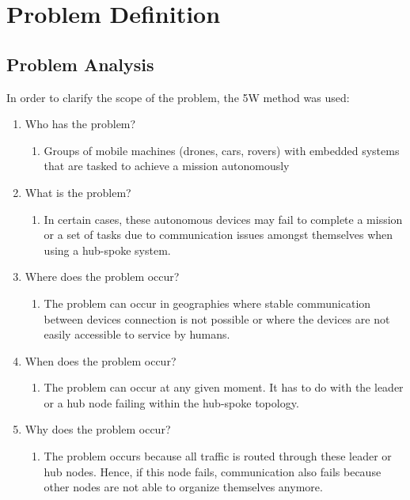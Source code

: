 \section{Problem Definition}
\subsection{Problem Analysis}
In order to clarify the scope of the problem, the 5W method was used:

\begin{enumerate}

    \item Who has the problem?
    \begin{enumerate}
        \item Groups of mobile machines (drones, cars, rovers) with embedded systems that are tasked to achieve a mission autonomously
    \end{enumerate}
    
    \item What is the problem?
    \begin{enumerate}
        \item In certain cases, these autonomous devices may fail to complete a mission or a set of tasks due to communication issues amongst themselves when using a hub-spoke system.
    \end{enumerate}
    
    \item Where does the problem occur?
    \begin{enumerate}
        \item The problem can occur in geographies where stable communication between devices connection is not possible or where the devices are not easily accessible to service by humans.
    \end{enumerate}
    
    \item When does the problem occur?
    \begin{enumerate}
        \item The problem can occur at any given moment. It has to do with the leader or a hub node failing within the hub-spoke topology.
    \end{enumerate}
    
    \item Why does the problem occur?
    \begin{enumerate}
        \item The problem occurs because all traffic is routed through these leader or hub nodes. Hence, if this node fails, communication also fails because other nodes are not able to organize themselves anymore.
    \end{enumerate}
\end{enumerate}


